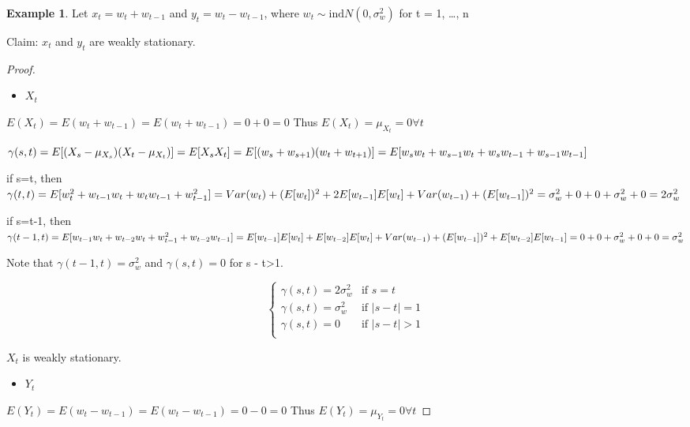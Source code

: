 \documentclass[
]{book}
\providecommand{\tightlist}{%
  \setlength{\itemsep}{0pt}\setlength{\parskip}{0pt}}
\theoremstyle{definition}
\theoremstyle{definition}
\newtheorem{example}{Example}[chapter]
\theoremstyle{definition}
\theoremstyle{definition}
\theoremstyle{remark}
\begin{document}
\begin{example}
Let \(x_t = w_t + w_{t-1}\) and \(y_t = w_t - w_{t-1}\), where \(w_t \sim \mathrm{ind}N(0,\sigma^2_w )\) for t = 1, \ldots, n

Claim: \(x_t\) and \(y_t\) are weakly stationary.
\end{example}

\begin{proof}
\leavevmode

\begin{itemize}
\tightlist
\item
  \(X_t\)
\end{itemize}

\(E(X_t)=E(w_t+w_{t-1})=E(w_t+w_{t-1})=0+0=0\)
Thus \(E(X_t)=\mu_{X_t}=0 \forall t\)

\(\gamma(s,t)=E[(X_s-\mu_{X_s})(X_t-\mu_{X_t})]\\=E[X_sX_t]=E[(w_s+w_{s+1})(w_t+w_{t+1})]\\=E[w_sw_t+w_{s-1}w_t+w_sw_{t-1}+w_{s-1}w_{t-1}]\)

if s=t, then \(\gamma(t,t)=E[w^2_t+ w_{t-1}w_t + w_tw_{t-1} + w^2_{t-1}]\\= Var(w_t) + (E[w_t])^2 + 2E[w_{t-1}]E[w_t] + Var(w_{t-1}) + (E[w_{t-1}])^2\\= \sigma^2_w + 0 + 0 + \sigma^2_w + 0= 2\sigma^2_w\)

if s=t-1, then \(\gamma(t-1,t)=E[w_{t-1}w_t+ w_{t-2}w_t + w^2_{t-1} + w_{t-2}w_{t-1}]\\= E[w_{t-1}]E[w_t] + E[w_{t-2}]E[w_t] + Var(w_{t-1}) +(E[w_{t-1}])^2 + E[w_{t-2}]E[w_{t-1}]\\= 0 + 0 + \sigma^2_w + 0+0=\sigma^2_w\)

Note that \(\gamma(t - 1, t) = \sigma^2_w\) and \(\gamma(s,t) = 0\) for \textbar s - t\textbar\textgreater1.

\[\begin{cases}
  \gamma(s,t)= 2\sigma^2_w & \text{if } s=t \\
  \gamma(s,t)= \sigma^2_w & \text{if } |s-t|=1\\
  \gamma(s,t)= 0 & \text{if } |s-t| > 1\\
\end{cases}\]

\(X_t\) is weakly stationary.

\begin{itemize}
\tightlist
\item
  \(Y_t\)
\end{itemize}

\(E(Y_t)=E(w_t-w_{t-1})=E(w_t-w_{t-1})=0-0=0\)
Thus \(E(Y_t)=\mu_{Y_t}=0 \forall t\)


\end{proof}
\end{document}
